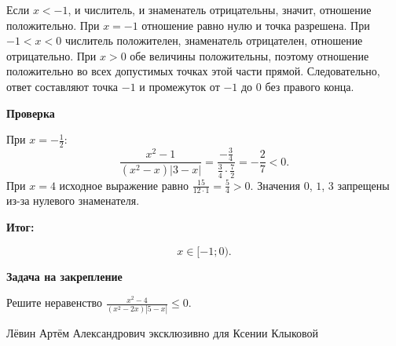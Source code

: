 \documentclass[12pt,a4paper]{article}
\newcommand{\parthead}[1]{\par\medskip\textbf{#1}\par\smallskip}
\begin{document}
Если $x<-1$, и числитель, и знаменатель отрицательны, значит, отношение положительно. При $x=-1$ отношение равно нулю и точка разрешена. При $-1<x<0$ числитель положителен, знаменатель отрицателен, отношение отрицательно. При $x>0$ обе величины положительны, поэтому отношение положительно во всех допустимых точках этой части прямой. Следовательно, ответ составляют точка $-1$ и промежуток от $-1$ до $0$ без правого конца.
\parthead{Проверка}
При $x=-\frac12$:
\[
\frac{x^2-1}{(x^2-x)|3-x|}
=\frac{-\frac34}{\frac34\cdot\frac72}=-\frac27<0.
\]
При $x=4$ исходное выражение равно $\frac{15}{12\cdot1}=\frac54>0$. Значения $0$, $1$, $3$ запрещены из-за нулевого знаменателя.
\parthead{\textcolor{teal!60!black}{Итог:}}
\[
\boxed{x\in[-1;0).}
\]
\parthead{Задача на закрепление}
Решите неравенство $\displaystyle\frac{x^2-4}{(x^2-2x)|5-x|}\le0$.
\vfill
\begin{center}
\small Лёвин Артём Александрович эксклюзивно для Ксении Клыковой
\end{center}
\end{document}
